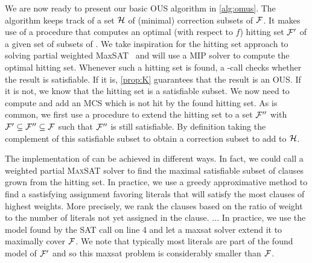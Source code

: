We are now ready to present our basic OUS algorithm in \cref{alg:omus}. 
The algorithm keeps track of a set $\mathcal{H}$ of (minimal) correction subsets of $\mathcal{F} $. 
It makes use of a procedure \ohs that computes an optimal (with respect to $f$) hitting set $\mathcal{F} '$  of a given set of subsets of \formula.
We take inspiration for the hitting set approach to solving partial weighted MaxSAT~\cite{davies2011solving} and will use a MIP solver to compute the optimal hitting set.
Whenever such a hitting set is found, a \sat-call checks whether the result is satisfiable. If it is, \cref{prop:K} guarantees that the result is an OUS. 
If it is not, we know that the hitting set is a satisfiable subset. We now need to compute and add an MCS which is not hit by the found hitting set.
As is common, we first use a procedure \grow to extend the hitting set to a set $\mathcal{F} ''$ with $\mathcal{F} '\subseteq \mathcal{F} ''\subseteq\mathcal{F} $ such that $\mathcal{F} ''$ is still satisfiable. By definition   taking the complement of this satisfiable subset to obtain a correction subset to add to $\mathcal{H}$.  

The implementation of \grow can be achieved in different ways.
In fact, we could call a weighted partial \textsc{MaxSAT} solver to find the maximal satisfiable subset of clauses grown from the hitting set.
In practice, we use a greedy approximative method to find a sastisfying assignment favoring literals that will satisfy the most clauses of highest weights.
More precisely, we rank the clauses based on the ratio of weight to the number of literals not yet assigned in the clause.
... In practice, we use the model found by the SAT call on line 4 and let a maxsat solver extend it to maximally cover $\mathcal{F} $. We note that typically most literals are part of the found model of $\mathcal{F} '$ and so this maxsat problem is considerably smaller than $\mathcal{F} $.

